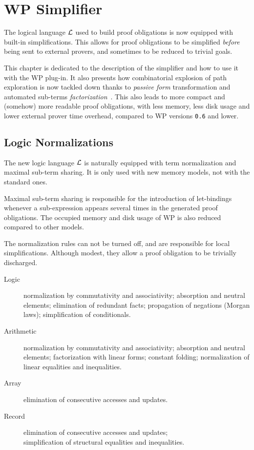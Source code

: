\chapter{WP Simplifier}
\label{wp-simplifier}

The logical language $\cal{L}$ used to build proof obligations is now
equipped with built-in simplifications. This allows for proof
obligations to be simplified \emph{before} being sent to external
provers, and sometimes to be reduced to trivial goals.

This chapter is dedicated to the description of the simplifier and how to
use it with the \textsf{WP} plug-in. It also presents how combinatorial
explosion of path exploration is now tackled down thanks to
\emph{passive form} transformation and automated sub-terms
\emph{factorization}~\cite{FlanaganSaxe2001,Leino2003}. This also
leads to more compact and (somehow) more readable proof obligations,
with less memory, less disk usage and lower external prover time
overhead, compared to \textsf{WP} versions \verb+0.6+ and lower.

\section{Logic Normalizations}

The new logic language $\cal{L}$ is naturally equipped with term
normalization and maximal sub-term sharing. It is only used with new
memory models, not with the standard ones.

Maximal sub-term sharing is responsible for the introduction of
let-bindings whenever a sub-expression appears several times in the
generated proof obligations. The occupied memory and disk usage of WP
is also reduced compared to other models.

The normalization rules can not be turned off, and are responsible for
local simplifications. Although modest, they allow a proof
obligation to be trivially discharged.

\begin{description}
\item[Logic] normalization by commutativity and associativity;
  absorption and neutral elements; elimination of redundant facts;
  propagation of negations (Morgan laws); simplification of
  conditionals.
\item[Arithmetic] normalization by commutativity and associativity;
  absorption and neutral elements; factorization with linear forms;
  constant folding; normalization of linear equalities and
  inequalities.
\item[Array] elimination of consecutive accesses and updates.
\item[Record] elimination of consecutive accesses and updates;\\
  simplification of structural equalities and inequalities.
\end{description}

